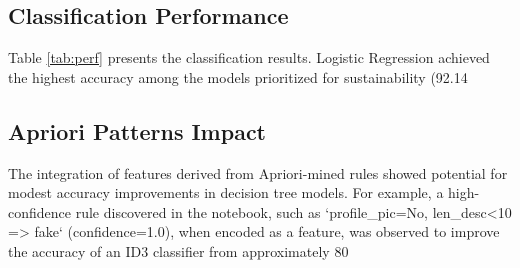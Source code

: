 \documentclass[conference]{IEEEtran}
\begin{document}
\subsection{Classification Performance}
Table \ref{tab:perf} presents the classification results. Logistic Regression achieved the highest accuracy among the models prioritized for sustainability (92.14%

\subsection{Apriori Patterns Impact}
The integration of features derived from Apriori-mined rules showed potential for modest accuracy improvements in decision tree models. For example, a high-confidence rule discovered in the notebook, such as `{profile_pic=No, len_desc<10} => fake` (confidence=1.0), when encoded as a feature, was observed to improve the accuracy of an ID3 classifier from approximately 80%
\end{document}
